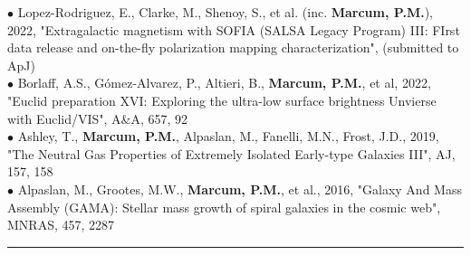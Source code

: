 {\scriptsize{$\bullet$}} Lopez-Rodriguez, E., Clarke, M., Shenoy, S., et al. (inc. \textbf{Marcum, P.M.}), 2022, "Extragalactic magnetism with SOFIA (SALSA Legacy Program) III: FIrst data release and on-the-fly polarization mapping characterization", (submitted to ApJ)\\
{\scriptsize{$\bullet$}} Borlaff, A.S., G{\'o}mez-Alvarez, P., Altieri, B., \textbf{Marcum, P.M.}, et al, 2022, "Euclid preparation XVI: Exploring the ultra-low surface brightness Unvierse with Euclid/VIS", A\&A, 657, 92\\
{\scriptsize{$\bullet$}} Ashley, T., \textbf{Marcum, P.M.}, Alpaslan, M., Fanelli, M.N., Frost, J.D., 2019, "The Neutral Gas Properties of Extremely Isolated Early-type Galaxies III", AJ, 157, 158\\
{\scriptsize{$\bullet$}} Alpaslan, M., Grootes, M.W., \textbf{Marcum, P.M.}, et al., 2016, "Galaxy And Mass Assembly (GAMA): Stellar mass growth of spiral galaxies in the cosmic web", MNRAS, 457, 2287\\
\medskip \hrule \vspace{5pt} \medskip